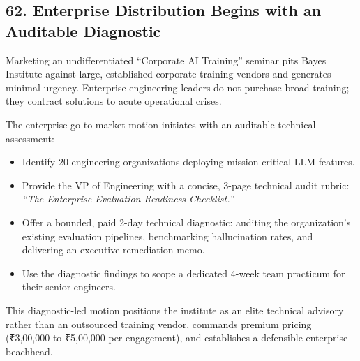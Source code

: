 \subsection*{62. Enterprise Distribution Begins with an Auditable Diagnostic}

Marketing an undifferentiated ``Corporate AI Training'' seminar pits Bayes Institute against large, established corporate training vendors and generates minimal urgency. Enterprise engineering leaders do not purchase broad training; they contract solutions to acute operational crises.

The enterprise go-to-market motion initiates with an auditable technical assessment:
\begin{itemize}[leftmargin=*,itemsep=1pt]
  \item Identify 20 engineering organizations deploying mission-critical LLM features.
  \item Provide the VP of Engineering with a concise, 3-page technical audit rubric: \textit{``The Enterprise Evaluation Readiness Checklist.''}
  \item Offer a bounded, paid 2-day technical diagnostic: auditing the organization's existing evaluation pipelines, benchmarking hallucination rates, and delivering an executive remediation memo.
  \item Use the diagnostic findings to scope a dedicated 4-week team practicum for their senior engineers.
\end{itemize}

This diagnostic-led motion positions the institute as an elite technical advisory rather than an outsourced training vendor, commands premium pricing (₹3,00,000 to ₹5,00,000 per engagement), and establishes a defensible enterprise beachhead.
